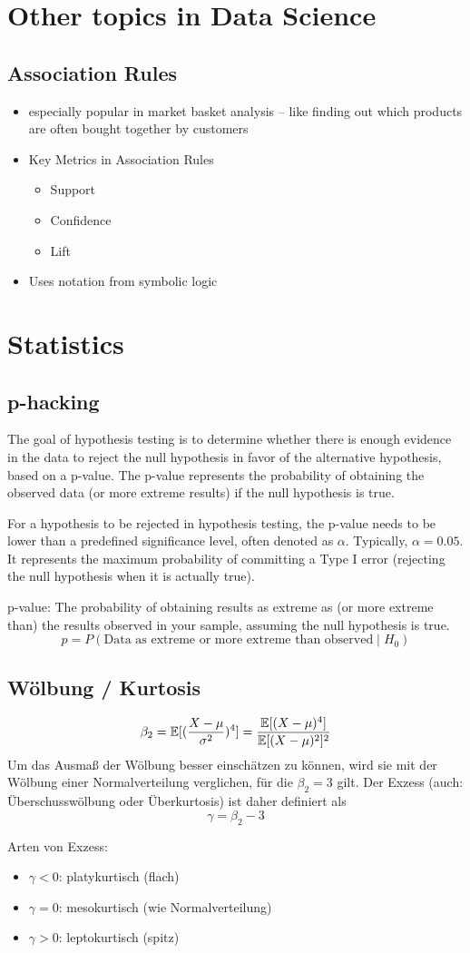 \documentclass[twoside,11pt]{article}
\begin{document}
\section{Other topics in Data Science}
\subsection{Association Rules}
\begin{itemize}
    \item especially popular in market basket analysis -- like finding out which products are often bought together by customers
    \item Key Metrics in Association Rules
    \begin{itemize}
        \item Support
        \item Confidence
        \item Lift
    \end{itemize}
    \item Uses notation from symbolic logic
\end{itemize}

\appendix
\section{Statistics}
\subsection{p-hacking}
The goal of hypothesis testing is to determine whether there is enough evidence in the data to reject the null hypothesis in favor of the alternative hypothesis, based on a p-value. The p-value represents the probability of obtaining the observed data (or more extreme results) if the null hypothesis is true.

For a hypothesis to be rejected in hypothesis testing, the p-value needs to be lower than a predefined significance level, often denoted as $\alpha$. Typically, $\alpha = 0.05$. It represents the maximum probability of committing a Type I error (rejecting the null hypothesis when it is actually true).

p-value: The probability of obtaining results as extreme as (or more extreme than) the results observed in your sample, assuming the null hypothesis is true.
$$ p=P(\text{Data as extreme or more extreme than observed}\mid H_0) $$

\subsection{Wölbung / Kurtosis}
$$ \beta_2 = \mathbb{E}[(\frac{X-\mu}{\sigma^2})^4] = \frac{\mathbb{E}[(X-\mu)^4]}{\mathbb{E}[(X-\mu)^2]^2}$$
Um das Ausmaß der Wölbung besser einschätzen zu können, wird sie mit der Wölbung einer Normalverteilung verglichen, für die $\beta_2 = 3$ gilt. Der Exzess (auch: Überschusswölbung oder Überkurtosis) ist daher definiert als
$$ \gamma = \beta_2 - 3 $$

Arten von Exzess:
\begin{itemize}
    \item $\gamma < 0$: platykurtisch (flach)
    \item $\gamma = 0$: mesokurtisch (wie Normalverteilung)
    \item $\gamma > 0$: leptokurtisch (spitz)
\end{itemize}



\printbibliography[heading=bibintoc]
\end{document}
